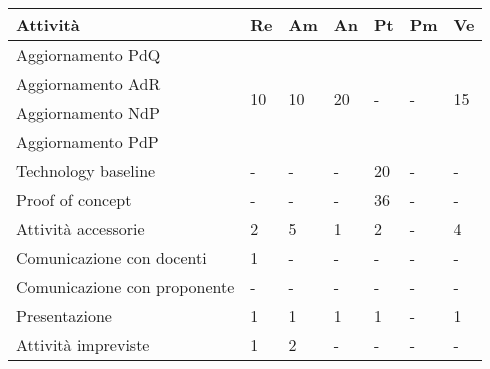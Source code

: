 \begin{table}[H]
	\centering
	\begin{tabular}{|l|l|l|l|l|l|l|}
		\hline
		\rowcolor{lighter-grayer}
		\textbf{Attività}            & \textbf{Re}         & \textbf{Am}         & \textbf{An}         & \textbf{Pt}        & \textbf{Pm}        & \textbf{Ve}         \\ \hline
		Aggiornamento PdQ            & \multirow{4}{*}{10} & \multirow{4}{*}{10} & \multirow{4}{*}{20} & \multirow{4}{*}{-} & \multirow{4}{*}{-} & \multirow{4}{*}{15} \\ \cline{1-1}
		Aggiornamento AdR            &                     &                     &                     &                    &                    &                     \\ \cline{1-1}
		Aggiornamento NdP            &                     &                     &                     &                    &                    &                     \\ \cline{1-1}
		Aggiornamento PdP            &                     &                     &                     &                    &                    &                     \\ \hline
		Technology baseline          & -                   & -                   & -                   & 20                 & -                  & -                   \\ \hline
		Proof of concept             & -                   & -                   & -                   & 36                 & -                  & -                   \\ \hline
		Attività accessorie          & 2                   & 5                   & 1                   & 2                  & -                  & 4                   \\ \hline
		Comunicazione con docenti    & 1                   & -                   & -                   & -                  & -                  & -                   \\ \hline
		Comunicazione con proponente & -                   & -                   & -                   & -                  & -                  & -                   \\ \hline
		Presentazione                & 1                   & 1                   & 1                   & 1                  & -                  & 1                   \\ \hline
		Attività impreviste          & 1                   & 2                   & -                   & -                  & -                  & -                   \\ \hline
	\end{tabular}
\end{table}

